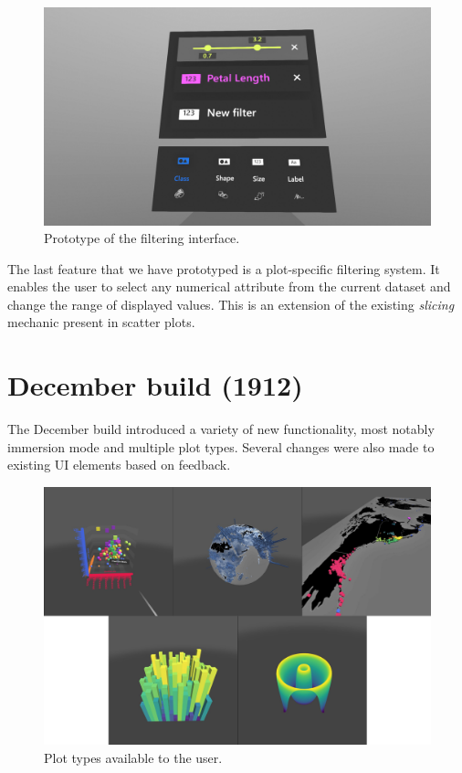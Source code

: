 \documentclass[thesis=M,english,hidelinks]{FITthesisXE}[2012/06/26]
\begin{document}
\begin{figure}[ht]
\centering
\includegraphics[scale=0.15]{maquette_filtering}
\caption{Prototype of the filtering interface.}
\label{fig:maquette_filtering}
\end{figure}

The last feature that we have prototyped is a plot-specific filtering system. It enables the user to select any numerical attribute from the current dataset and change the range of displayed values. This is an extension of the existing \emph{slicing} mechanic present in scatter plots.

\section{December build (1912)}

The December build introduced a variety of new functionality, most notably immersion mode and multiple plot types. Several changes were also made to existing UI elements based on feedback.

\begin{figure}[ht]
\centering
\includegraphics[scale=0.12]{navigator_plottypes}
\caption{Plot types available to the user.}
\label{fig:navigator_plottypes}
\end{figure}
\end{document}

